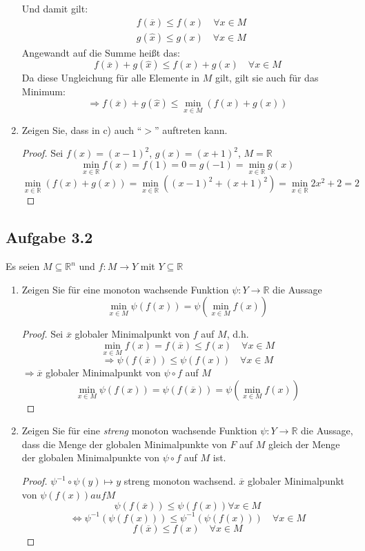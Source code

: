 \documentclass[12pt]{extreport} %
\newcommand{\R}{\mathbb{R}}
\theoremstyle{named}
\theoremstyle{nnamed}
\theoremstyle{itshape}
\theoremstyle{normal}
\begin{document}
\begin{enumerate}
\begin{description}
		\end{description}
		Und damit gilt:
			\begin{align*}
				& f(\overline{x}) \leq f(x) \quad \forall x \in M \\
				& g(\hat{x}) \leq g(x) \quad \forall x \in M
			\end{align*}
		Angewandt auf die Summe heißt das:
		$$ f(\overline{x}) + g(\hat{x}) \leq f(x) + g(x) \quad \forall x \in M $$
		Da diese Ungleichung für alle Elemente in $M$ gilt, gilt sie auch für das Minimum:
		$$ \Rightarrow f(\overline{x}) + g(\hat{x}) \leq \min_{x \in M} \left( f(x) + g(x) \right) $$
	\item Zeigen Sie, dass in c) auch \enquote{$>$} auftreten kann.
		\begin{proof}
			Sei $f(x) = (x - 1)^2$, $g(x) = (x +1)^2$, $M = \R$
			$$ \min_{x \in \R} f(x) = f(1) = 0 = g(-1) = \min_{x \in \R} g(x) $$
			$$ \min_{x \in \R} \left( f(x) + g(x) \right) = \min_{x \in \R} \left( (x - 1)^2 + (x + 1)^2 \right) = \min_{x \in \R} 2 x^2 + 2 = 2 $$
		\end{proof}
\end{enumerate}

\subsection*{Aufgabe 3.2}

Es seien $M \subseteq \R^n$ und $f \colon M \rightarrow Y$ mit $Y \subseteq \R$
\begin{enumerate}
	\item Zeigen Sie für eine monoton wachsende Funktion $\psi \colon Y \rightarrow \R$ die Aussage
					$$ \min_{x \in M} \psi \left( f(x) \right) = \psi \left( \min_{x \in M} f(x) \right) $$
		\begin{proof}
			Sei $\overline{x}$ globaler Minimalpunkt von $f$ auf $M$, d.h.
			$$\min_{x \in M} f(x) = f(\overline{x}) \leq f(x) \quad \forall x \in M$$
				$$ \Rightarrow \psi(f(\overline{x})) \leq \psi(f(x)) \quad \forall x \in M $$
			$\Rightarrow \overline{x}$ globaler Minimalpunkt von $\psi \circ f$ auf $M$
			$$ \min_{x \in M} \psi(f(x)) = \psi(f(\overline{x})) = \psi(\min_{x \in M} f(x)) $$
		\end{proof}
	\item Zeigen Sie für eine \textit{streng} monoton wachsende Funktion $\psi \colon Y \rightarrow \R$ die Aussage, dass die Menge der globalen Minimalpunkte von $F$ auf $M$ gleich der Menge der globalen Minimalpunkte von $\psi \circ f$ auf $M$ ist.
		\begin{proof}
			$\psi^{-1} \circ \psi(y) \mapsto y$ streng monoton wachsend. $\overline{x}$ globaler Minimalpunkt von $\psi(f(x)) auf M$
			$$ \psi(f(\overline{x})) \leq \psi(f(x)) \forall x \in M $$
			$$ \iff \psi^{-1} \left( \psi( f(x) ) \right) \leq \psi^{-1}\left(\psi(f(x)) \right) \quad \forall x \in M$$
			$$ f(\overline{x}) \leq f(x) \quad \forall x \in M  $$
		\end{proof}
\end{enumerate}
\end{document}
